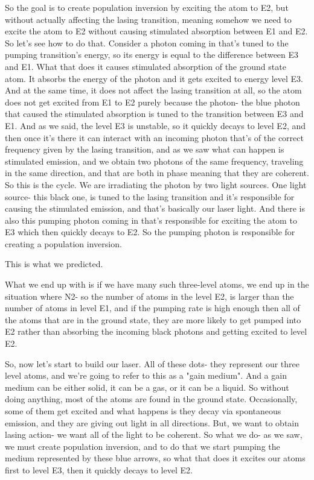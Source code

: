 So the goal is to create population inversion by exciting the atom to E2, but without actually affecting the lasing transition, meaning somehow we need to excite the atom to E2 without causing stimulated absorption between E1 and E2. So let's see how to do that. Consider a photon coming in that's tuned to the pumping transition's energy, so its energy is equal to the difference between E3 and E1. What that does it causes stimulated absorption of the ground state atom. It absorbs the energy of the photon and it gets excited to energy level E3. And at the same time, it does not affect the lasing transition at all, so the atom does not get excited from E1 to E2 purely because the photon- the blue photon that caused the stimulated absorption is tuned to the transition between E3 and E1. And as we said, the level E3 is unstable, so it quickly decays to level E2, and then once it's there it can interact with an incoming photon that's of the correct frequency given by the lasing transition, and as we saw what can happen is stimulated emission, and we obtain two photons of the same frequency, traveling in the same direction, and that are both in phase meaning that they are coherent. So this is the cycle. We are irradiating the photon by two light sources. One light source- this black one, is tuned to the lasing transition and it's responsible for causing the stimulated emission, and that's basically our laser light. And there is also this pumping photon coming in that's responsible for exciting the atom to E3 which then quickly decays to E2. So the pumping photon is responsible for creating a population inversion.


This is what we predicted. 

What we end up with is if we have many such three-level atoms, we end up in the situation where N2- so the number of atoms in the level E2, is larger than the number of atoms in level E1, and if the pumping rate is high enough then all of the atoms that are in the ground state, they are more likely to get pumped into E2 rather than absorbing the incoming black photons and getting excited to level E2.

So, now let's start to build our laser. All of these dots- they represent our three level atoms, and we're going to refer to this as a "gain medium". And a gain medium can be either solid, it can be a gas, or it can be a liquid. So without doing anything, most of the atoms are found in the ground state. Occasionally, some of them get excited and what happens is they decay via spontaneous emission, and they are giving out light in all directions. But, we want to obtain lasing action- we want all of the light to be coherent. So what we do- as we saw, we must create population inversion, and to do that we start pumping the medium represented by these blue arrows, so what that does it excites our atoms first to level E3, then it quickly decays to level E2.

